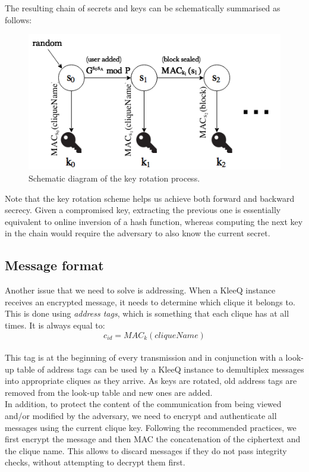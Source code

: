 \documentclass[a4paper, twoside, 12pt]{report}
\begin{document}
The resulting chain of secrets and keys can be schematically summarised as follows:
\begin{figure}[H]
    \centering
    \includegraphics[width = 0.8 \linewidth]{pics/keys_secrets.png}
    \caption{\label{fig:keys_secrets}Schematic diagram of the key rotation process.}
\end{figure}

Note that the key rotation scheme helps us achieve both forward and backward secrecy. Given a compromised key, extracting the previous one is essentially equivalent to online inversion of a hash function, whereas computing the next key in the chain would require the adversary to also know the current secret.


\subsection{Message format}
\label{ssec:prep.proto.msg_fmt}
Another issue that we need to solve is addressing. When a KleeQ instance receives an encrypted message, it needs to determine which clique it belongs to. This is done using \emph{address tags}, which is something that each clique has at all times. It is always equal to:
\begin{equation*}
    c_{id} = MAC_{k}(cliqueName)
\end{equation*} \\
This tag is at the beginning of every transmission and in conjunction with a look-up table of address tags can be used by a KleeQ instance to demultiplex messages into appropriate cliques as they arrive. As keys are rotated, old address tags are removed from the look-up table and new ones are added.\\

In addition, to protect the content of the communication from being viewed and/or modified by the adversary, we need to encrypt and authenticate all messages using the current clique key. Following the recommended practices, we first encrypt the message and then MAC the concatenation of the ciphertext and the clique name. This allows to discard messages if they do not pass integrity checks, without attempting to decrypt them first.
\end{document}
